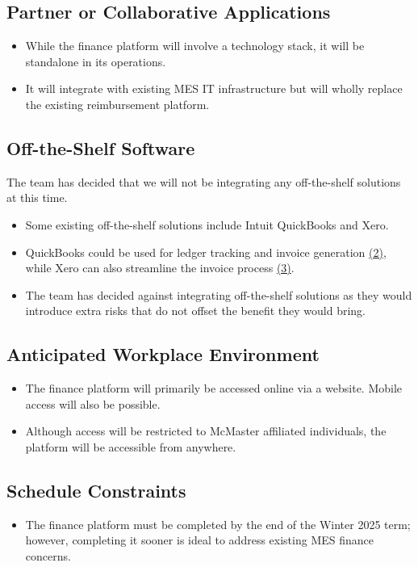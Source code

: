 \documentclass[12pt]{article}
\begin{document}
\subsection{Partner or Collaborative Applications}
\begin{itemize}
    \item While the finance platform will involve a technology stack, it will be standalone in its operations.
    \item It will integrate with existing MES IT infrastructure but will wholly replace the existing reimbursement platform.
\end{itemize}
 

\subsection{Off-the-Shelf Software}
The team has decided that we will not be integrating any off-the-shelf solutions at this time.

\begin{itemize}
    \item Some existing off-the-shelf solutions include Intuit QuickBooks and Xero.
    \item QuickBooks could be used for ledger tracking and invoice generation \hyperlink{Ref2}{(2)}, while Xero can also streamline the invoice process \hyperlink{Ref3}{(3)}.
    \item The team has decided against integrating off-the-shelf solutions as they would introduce extra risks that do not offset the benefit they would bring. 
\end{itemize}
 
\subsection{Anticipated Workplace Environment}
\begin{itemize}
    \item The finance platform will primarily be accessed online via a website. Mobile access will also be possible. 
    \item Although access will be restricted to McMaster affiliated individuals, the platform will be accessible from anywhere.
\end{itemize}
 

\subsection{Schedule Constraints}
\begin{itemize}
    \item The finance platform must be completed by the end of the Winter 2025 term; however, completing it sooner is ideal to address existing MES finance concerns.
\end{itemize}
\end{document}
